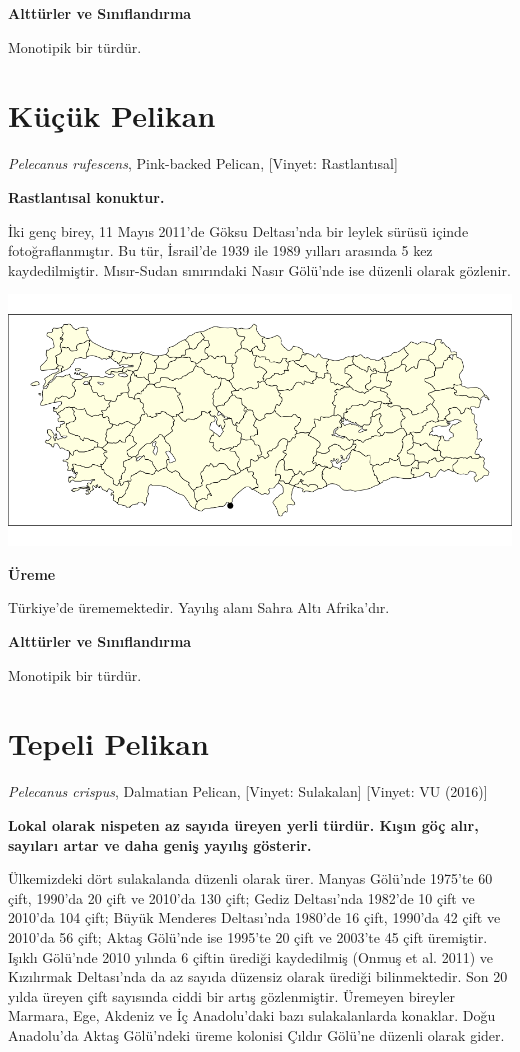 \documentclass[
  letterpaper,
  DIV=11,
  numbers=noendperiod]{scrreprt}
\begin{document}
\textbf{Alttürler ve Sınıflandırma}

Monotipik bir türdür.

\section{Küçük Pelikan}\label{kuxfcuxe7uxfck-pelikan}

\emph{Pelecanus rufescens}, Pink-backed Pelican, {[}Vinyet:
Rastlantısal{]}

\textbf{Rastlantısal konuktur.}

İki genç birey, 11 Mayıs 2011'de Göksu Deltası'nda bir leylek sürüsü
içinde fotoğraflanmıştır. Bu tür, İsrail'de 1939 ile 1989 yılları
arasında 5 kez kaydedilmiştir. Mısır-Sudan sınırındaki Nasır Gölü'nde
ise düzenli olarak gözlenir.

\includegraphics{images/harita_Pelecanus_rufescens.png}

\textbf{Üreme}

Türkiye'de ürememektedir. Yayılış alanı Sahra Altı Afrika'dır.

\textbf{Alttürler ve Sınıflandırma}

Monotipik bir türdür.

\section{Tepeli Pelikan}\label{tepeli-pelikan}

\emph{Pelecanus crispus}, Dalmatian Pelican, {[}Vinyet: Sulakalan{]}
{[}Vinyet: VU (2016){]}

\textbf{Lokal olarak nispeten az sayıda üreyen yerli türdür. Kışın göç
alır, sayıları artar ve daha geniş yayılış gösterir.}

Ülkemizdeki dört sulakalanda düzenli olarak ürer. Manyas Gölü'nde
1975'te 60 çift, 1990'da 20 çift ve 2010'da 130 çift; Gediz Deltası'nda
1982'de 10 çift ve 2010'da 104 çift; Büyük Menderes Deltası'nda 1980'de
16 çift, 1990'da 42 çift ve 2010'da 56 çift; Aktaş Gölü'nde ise 1995'te
20 çift ve 2003'te 45 çift üremiştir. Işıklı Gölü'nde 2010 yılında 6
çiftin ürediği kaydedilmiş (Onmuş et al. 2011) ve Kızılırmak Deltası'nda
da az sayıda düzensiz olarak ürediği bilinmektedir. Son 20 yılda üreyen
çift sayısında ciddi bir artış gözlenmiştir. Üremeyen bireyler Marmara,
Ege, Akdeniz ve İç Anadolu'daki bazı sulakalanlarda konaklar. Doğu
Anadolu'da Aktaş Gölü'ndeki üreme kolonisi Çıldır Gölü'ne düzenli olarak
gider.
\end{document}
